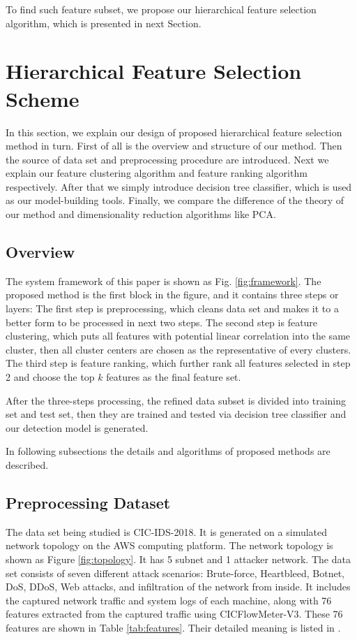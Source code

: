 \documentclass{ieeeaccess}
\theoremstyle{definition}
\begin{document}
To find such feature subset, we propose our hierarchical feature selection algorithm, which is presented in next Section.

\section{Hierarchical Feature Selection Scheme}
\label{sec:methods}

In this section, we explain our design of proposed hierarchical feature selection method in turn. First of all is the overview and structure of our method. Then the source of data set and preprocessing procedure are introduced. Next we explain our feature clustering algorithm and feature ranking algorithm respectively. After that we simply introduce decision tree classifier, which is used as our model-building tools. Finally, we compare the difference of the theory of our method and dimensionality reduction algorithms like PCA.

\subsection{Overview}

The system framework of this paper is shown as Fig. \ref{fig:framework}. 
The proposed method is the first block in the figure, and it contains three steps or layers: The first step is preprocessing, which cleans data set and makes it to a better form to be processed in next two steps. The second step is feature clustering, which puts all features with potential linear correlation into the same cluster, then all cluster centers are chosen as the representative of every clusters. The third step is feature ranking, which further rank all features selected in step 2 and choose the top $k$ features as the final feature set. 

After the three-steps processing, the refined data subset is divided into training set and test set, then they are trained and tested via decision tree classifier and our detection model is generated.

In following subsections the details and algorithms of proposed methods are described.

\subsection{Preprocessing Dataset}

The data set being studied is CIC-IDS-2018\cite{cic2018}. 
It is generated on a simulated network topology on the AWS computing platform. The network topology is shown as Figure \ref{fig:topology}. It has 5 subnet and 1 attacker network.  
The data set consists of seven different attack scenarios: Brute-force, Heartbleed, Botnet, DoS, DDoS, Web attacks, and infiltration of the network from inside. It includes the captured network traffic and system logs of each machine, along with 76 features extracted from the captured traffic using CICFlowMeter-V3\cite{cicflowmeter}. These 76 features are shown in Table \ref{tab:features}. Their detailed meaning is listed in \cite{cic2018}.
\end{document}
